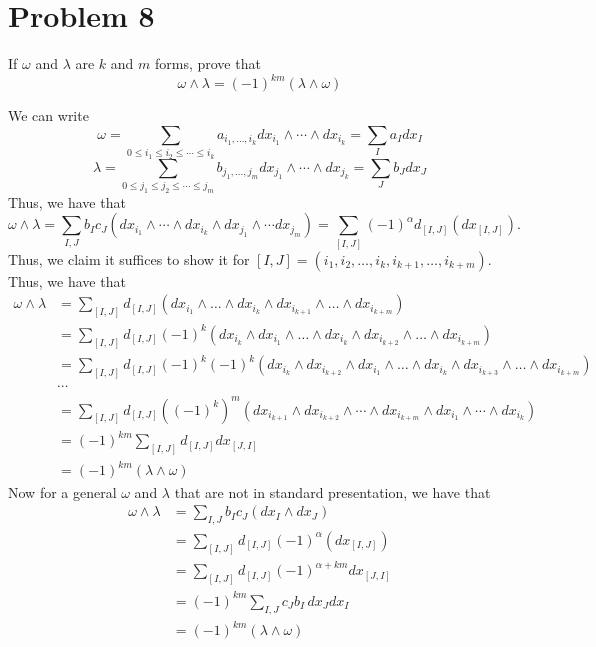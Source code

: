 \documentclass[11pt]{article}
\begin{document}
\section*{Problem 8}
\begin{problem}
    If $\omega$ and $\lambda$ are $k$ and $m$ forms, prove that 
    \[\omega \wedge \lambda = (-1)^{km}(\lambda \wedge \omega)\]
\end{problem}
\begin{solution}
    We can write 
    \[\omega = \sum_{0 \leq i_1 \leq i_2 \leq \cdots \leq i_k} a_{i_1, \dots, i_k}dx_{i_1}\wedge \cdots \wedge dx_{i_k} = \sum _I a_I dx_I\]
    \[\lambda = \sum_{0 \leq j_1 \leq j_2 \leq \cdots \leq j_m} b_{j_1, \dots, j_m}dx_{j_1}\wedge \cdots \wedge dx_{j_k} = \sum_J b_J dx_J\] Thus, we have that 
    \[\omega \wedge \lambda = \sum_{I,J} b_I c_J (dx_{i_1}\wedge \cdots \wedge dx_{i_k} \wedge dx_{j_1}\wedge \cdots dx_{j_m}) = \sum_{[I,J]}(-1)^\alpha d_{[I,J]}(dx_{[I,J]}).\] Thus, we claim it suffices to show it for $[I,J] = (i_1, i_2, \dots, i_k, i_{k+1}, \dots, i_{k+m}).$ Thus, we have that 
    \begin{align*}
        \omega \wedge \lambda &= \sum_{[I,J]} d_{[I,J]}(dx_{i_1}\wedge \dots\wedge dx_{i_k}\wedge dx_{i_{k+1}}\wedge \dots\wedge dx_{i_{k+m}})\\
        &= \sum_{[I,J]} d_{[I,J]}(-1)^k(dx_{i_k}\wedge dx_{i_1}\wedge \dots\wedge dx_{i_{k}}\wedge dx_{i_{k+2}}\wedge \dots\wedge dx_{i_{k+m}})\\
        &= \sum_{[I,J]} d_{[I,J]}(-1)^k(-1)^k(dx_{i_k}\wedge dx_{i_{k+2}}\wedge dx_{i_1}\wedge \dots\wedge dx_{i_{k}}\wedge dx_{i_{k+3}}\wedge \dots\wedge dx_{i_{k+m}})\\
        &\cdots\\
        &= \sum_{[I,J]}d_{[I,J]} ((-1)^k)^m (dx_{i_{k+1}}\wedge dx_{i_{k+2}}\wedge \cdots \wedge dx_{i_{k+m}} \wedge dx_{i_{1}}\wedge \cdots  \wedge dx_{i_k})\\
        &= (-1)^{km}\sum_{[I,J]} d_{[I,J]}dx_{[J,I]}\\
        &= (-1)^{km} (\lambda \wedge \omega)
    \end{align*}
    Now for a general $\omega$ and $\lambda$ that are not in standard presentation, we have that 
    \begin{align*}
    \omega \wedge \lambda& = \sum_{I,J} b_I c_J(dx_I \wedge dx_J)\\&= \sum_{[I,J]}d_{[I,J]}(-1)^\alpha (dx_{[I,J]})\\ &= \sum_{[I,J]} d_{[I,J]}(-1)^{\alpha + km}dx_{[J,I]}\\& = (-1)^{km}\sum_{I,J}c_J b_I \,dx_J dx_I\\& = (-1)^{km}(\lambda \wedge \omega)    
    \end{align*}
    
\end{solution}
\end{document}
